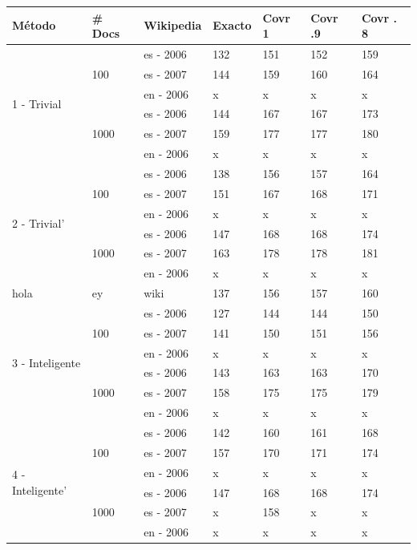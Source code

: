 \begin{center}
\begin{tabular}{|l|l|l|l|l|l|l|}
\hline
Método & \# Docs & Wikipedia & Exacto & Covr 1 & Covr .9 & Covr . 8 \\ \hline

\multirow{6}{*}{1 - Trivial} & 
\multirow{3}{*}{100} & es - 2006 & 132 & 151 & 152 & 159 \\ 
 &  & es - 2007 & 144 & 159 & 160 & 164 \\
 &  & en - 2006 & x & x & x & x \\ \cline{2-7}
 & \multirow{3}{*}{1000} & es - 2006 & 144 & 167 & 167 & 173 \\  
 &  & es - 2007 & 159 & 177 & 177 & 180 \\
 &  & en - 2006 & x & x & x & x \\ \hline

\multirow{6}{*}{2 - Trivial'} & 
\multirow{3}{*}{100} & es - 2006 & 138 & 156 & 157 & 164 \\ 
 &  & es - 2007 & 151 & 167 & 168 & 171 \\
 &  & en - 2006 & x & x & x & x \\ \cline{2-7}
 & \multirow{3}{*}{1000} & es - 2006 & 147 & 168 & 168 & 174 \\ 
 &  & es - 2007 & 163 & 178 & 178 & 181 \\
 &  & en - 2006 & x & x & x & x \\ \hline
hola & ey &wiki& 137 & 156 & 157 & 160  \\ \hline
\multirow{6}{*}{3 - Inteligente} & 
\multirow{3}{*}{100} & es - 2006 & 127 & 144 & 144 & 150 \\ 
 &  & es - 2007 & 141 & 150 & 151 & 156 \\
 &  & en - 2006 & x & x & x & x \\ \cline{2-7}

 & \multirow{3}{*}{1000} & es - 2006 & 143 & 163 & 163 & 170 \\   
 &  & es - 2007 & 158 & 175 & 175 & 179 \\
 &  & en - 2006 & x & x & x & x \\ \hline

\multirow{6}{*}{4 - Inteligente'} & 
\multirow{3}{*}{100} & es - 2006 & 142 & 160 & 161 & 168 \\ 
 &  & es - 2007 & 157 & 170 & 171 & 174  \\
 &  & en - 2006 & x & x & x & x \\ \cline{2-7}


 & \multirow{3}{*}{1000} & es - 2006 & 147 & 168 & 168 & 174 \\ 
 &  & es - 2007 & x & 158 & x & x \\
 &  & en - 2006 & x & x & x & x \\ \hline
 
\end{tabular}
\end{center}


